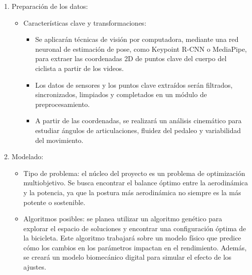 \documentclass[
11pt, %
]{charter}
\begin{document}
\begin{enumerate}
  \item Preparación de los datos:
    \begin{itemize}
      \item Características clave y transformaciones:
        \begin{itemize}
          \item Se aplicarán técnicas de visión por computadora, mediante una red neuronal de estimación de pose, como Keypoint R-CNN o MediaPipe, para extraer las coordenadas 2D de puntos clave del cuerpo del ciclista a partir de los videos.
          \item Los datos de sensores y los puntos clave extraídos serán filtrados, sincronizados, limpiados y completados en un módulo de preprocesamiento.
          \item A partir de las coordenadas, se realizará un análisis cinemático para estudiar ángulos de articulaciones, fluidez del pedaleo y variabilidad del movimiento.
        \end{itemize}
    \end{itemize}

  \item Modelado:
    \begin{itemize}
      \item Tipo de problema: el núcleo del proyecto es un problema de optimización multiobjetivo. Se busca encontrar el balance óptimo entre la aerodinámica y la potencia, ya que la postura más aerodinámica no siempre es la más potente o sostenible.
      \item Algoritmos posibles: se planea utilizar un algoritmo genético para explorar el espacio de soluciones y encontrar una configuración óptima de la bicicleta. Este algoritmo trabajará sobre un modelo físico que predice cómo los cambios en los parámetros impactan en el rendimiento. Además, se creará un modelo biomecánico digital para simular el efecto de los ajustes.
    \end{itemize}


\end{enumerate}
\end{document}
